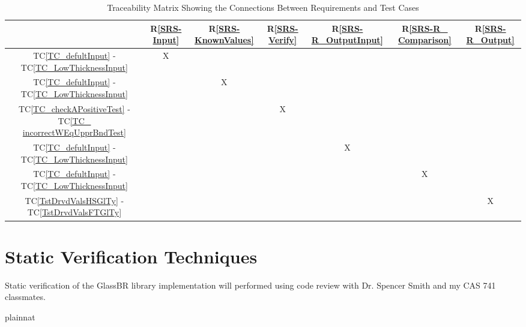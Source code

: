\documentclass[12pt, titlepage]{article}
\newcommand{\rref}[1]{R\ref{#1}}
\newcommand{\tcref}[1]{TC\ref{#1}}
\newcommand{\progname}{GlassBR}
\begin{document}
\begin{table}[!h]
	\centering
	\begin{tabular}{|c|c|c|c|c|c|c|}
		\hline
		& \rref{SRS-Input}& \rref{SRS-KnownValues}& \rref{SRS-Verify}& \rref{SRS-R_OutputInput}& 
		\rref{SRS-R_ Comparison}& \rref{SRS-R_Output}\\
		\hline
		\tcref{TC_defultInput} - \tcref{TC_LowThicknessInput}                 
		& X& & & & &  \\ \hline
		\tcref{TC_defultInput} - \tcref{TC_LowThicknessInput}                 
		& &X & & & &  \\ \hline
		\tcref{TC_checkAPositiveTest} - \tcref{TC_ incorrectWEqUpprBndTest} 
		& & & X& & & \\ \hline
		\tcref{TC_defultInput} - \tcref{TC_LowThicknessInput}                             
		& & & &X& &   \\ \hline
		\tcref{TC_defultInput} - \tcref{TC_LowThicknessInput}                              
		& & & & &X &   \\ \hline
		\tcref{TstDrvdValsHSGlTy} - \tcref{TstDrvdValsFTGlTy}                                                
		& & & & & &X  \\ \hline
		
		\hline
	\end{tabular}
	\caption{Traceability Matrix Showing the Connections Between Requirements 
	and Test Cases}
	\label{Table:T_trace}
\end{table}

\section{Static Verification Techniques} \label{sec_Static}

Static verification of the \progname{} library implementation will performed using
code review with Dr. Spencer Smith and my CAS 741 classmates.
				
\newpage

 {plainnat}


%
%
%
%
%
\end{document}
